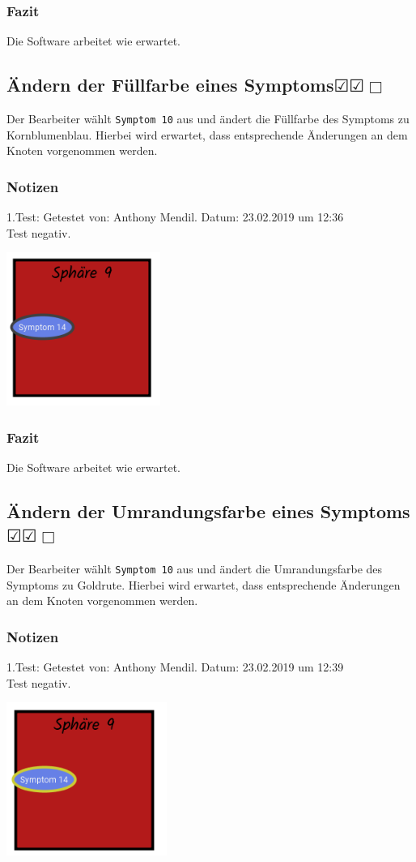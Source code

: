 \documentclass{scrartcl}
\newcommand{\subsectiont}[2]{\subsection[#1]{#1{\normalsize\normalfont #2}}}
\newcommand{\leer}{$\Box$}
\newcommand{\ok}{$\CheckedBox$}
\begin{document}
\subsubsection{Fazit}
Die Software arbeitet wie erwartet.

\subsectiont{Ändern der Füllfarbe eines Symptoms}{\dotfill\ok\ok\leer}
Der Bearbeiter wählt \texttt{Symptom 10} aus und ändert die Füllfarbe des Symptoms zu Kornblumenblau. Hierbei wird erwartet, dass entsprechende Änderungen an dem Knoten vorgenommen werden.
\subsubsection{Notizen}
1.Test: Getestet von: Anthony Mendil. Datum: 23.02.2019 um 12:36 \\
Test negativ.
\begin{center}
\includegraphics[height=5cm]{2_25.PNG}
\end{center}
\subsubsection{Fazit}
Die Software arbeitet wie erwartet.

\subsectiont{Ändern der Umrandungsfarbe eines Symptoms}{\dotfill\ok\ok\leer}
Der Bearbeiter wählt \texttt{Symptom 10} aus und ändert die Umrandungsfarbe des Symptoms zu Goldrute. Hierbei wird erwartet, dass entsprechende Änderungen an dem Knoten vorgenommen werden.
\subsubsection{Notizen}
1.Test: Getestet von: Anthony Mendil. Datum: 23.02.2019 um 12:39 \\
Test negativ.
\begin{center}
\includegraphics[height=5cm]{2_26.PNG}
\end{center}
\end{document}
